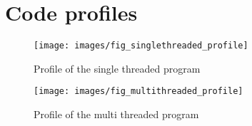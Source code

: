 \documentclass[journal,transmag]{IEEEtran}
\begin{document}
\newpage

\appendices

\section{Code profiles}
	\begin{figure}[!t]
	\centering
	\texttt{[image: images/fig\_singlethreaded\_profile]}
        \caption{Profile of the single threaded program}
	\label{fig_singlethreaded_profile}
        \end{figure}
	\begin{figure}[!t]
	\centering
	\texttt{[image: images/fig\_multithreaded\_profile]}
        \caption{Profile of the multi threaded program}
	\label{fig_multithreaded_profile}
        \end{figure}



\end{document}
